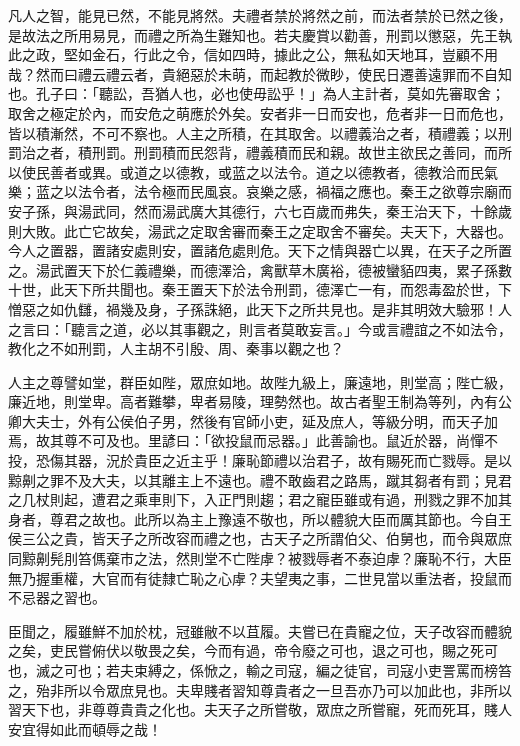 \begin{pinyinscope}
凡人之智，能見已然，不能見將然。夫禮者禁於將然之前，而法者禁於已然之後，是故法之所用易見，而禮之所為生難知也。若夫慶賞以勸善，刑罰以懲惡，先王執此之政，堅如金石，行此之令，信如四時，據此之公，無私如天地耳，豈顧不用哉？然而曰禮云禮云者，貴絕惡於未萌，而起教於微眇，使民日遷善遠罪而不自知也。孔子曰：「聽訟，吾猶人也，必也使毋訟乎！」為人主計者，莫如先審取舍；取舍之極定於內，而安危之萌應於外矣。安者非一日而安也，危者非一日而危也，皆以積漸然，不可不察也。人主之所積，在其取舍。以禮義治之者，積禮義；以刑罰治之者，積刑罰。刑罰積而民怨背，禮義積而民和親。故世主欲民之善同，而所以使民善者或異。或道之以德教，或蓝之以法令。道之以德教者，德教洽而民氣樂；蓝之以法令者，法令極而民風哀。哀樂之感，禍福之應也。秦王之欲尊宗廟而安子孫，與湯武同，然而湯武廣大其德行，六七百歲而弗失，秦王治天下，十餘歲則大敗。此亡它故矣，湯武之定取舍審而秦王之定取舍不審矣。夫天下，大器也。今人之置器，置諸安處則安，置諸危處則危。天下之情與器亡以異，在天子之所置之。湯武置天下於仁義禮樂，而德澤洽，禽獸草木廣裕，德被蠻貊四夷，累子孫數十世，此天下所共聞也。秦王置天下於法令刑罰，德澤亡一有，而怨毒盈於世，下憎惡之如仇讎，禍幾及身，子孫誅絕，此天下之所共見也。是非其明效大驗邪！人之言曰：「聽言之道，必以其事觀之，則言者莫敢妄言。」今或言禮誼之不如法令，教化之不如刑罰，人主胡不引殷、周、秦事以觀之也？

人主之尊譬如堂，群臣如陛，眾庶如地。故陛九級上，廉遠地，則堂高；陛亡級，廉近地，則堂卑。高者難攀，卑者易陵，理勢然也。故古者聖王制為等列，內有公卿大夫士，外有公侯伯子男，然後有官師小吏，延及庶人，等級分明，而天子加焉，故其尊不可及也。里諺曰：「欲投鼠而忌器。」此善諭也。鼠近於器，尚憚不投，恐傷其器，況於貴臣之近主乎！廉恥節禮以治君子，故有賜死而亡戮辱。是以黥劓之罪不及大夫，以其離主上不遠也。禮不敢齒君之路馬，蹴其芻者有罰；見君之几杖則起，遭君之乘車則下，入正門則趨；君之寵臣雖或有過，刑戮之罪不加其身者，尊君之故也。此所以為主上豫遠不敬也，所以體貌大臣而厲其節也。今自王侯三公之貴，皆天子之所改容而禮之也，古天子之所謂伯父、伯舅也，而令與眾庶同黥劓髡刖笞傌棄巿之法，然則堂不亡陛虖？被戮辱者不泰迫虖？廉恥不行，大臣無乃握重權，大官而有徒隸亡恥之心虖？夫望夷之事，二世見當以重法者，投鼠而不忌器之習也。

臣聞之，履雖鮮不加於枕，冠雖敝不以苴履。夫嘗已在貴寵之位，天子改容而體貌之矣，吏民嘗俯伏以敬畏之矣，今而有過，帝令廢之可也，退之可也，賜之死可也，滅之可也；若夫束縛之，係惞之，輸之司寇，編之徒官，司寇小吏詈罵而榜笞之，殆非所以令眾庶見也。夫卑賤者習知尊貴者之一旦吾亦乃可以加此也，非所以習天下也，非尊尊貴貴之化也。夫天子之所嘗敬，眾庶之所嘗寵，死而死耳，賤人安宜得如此而頓辱之哉！


\end{pinyinscope}
